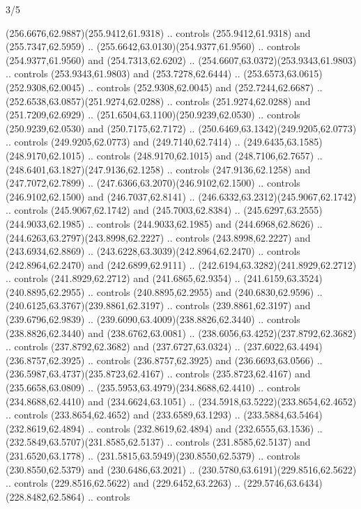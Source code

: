 \begin{flagdescription}{3/5}
\begin{scope}[xshift=0.5\flaglength,yshift=0.5\flagwidth,scale=\flagwidth/99]
\begin{scope}[y=0.8pt, x=0.8pt, yscale=-0.20628, xscale=0.20628,shift={(-500,-300)}]
\begin{scope}[cm={{0.79646,0.0,0.0,0.7753,(100.0721,273.79617)}}]
\begin{scope}[cm={{-1.08438,0.0,0.0,1.08438,(1036.5897,-11.27143)}}]
\begin{scope}[cm={{-1.03962,0.13985,0.13985,1.03962,(780.1168,-25.80961)}}]
  (256.6676,62.9887)(255.9412,61.9318) .. controls (255.9412,61.9318) and
  (255.7347,62.5959) .. (255.6642,63.0130)(254.9377,61.9560) .. controls
  (254.9377,61.9560) and (254.7313,62.6202) ..
  (254.6607,63.0372)(253.9343,61.9803) .. controls (253.9343,61.9803) and
  (253.7278,62.6444) .. (253.6573,63.0615)(252.9308,62.0045) .. controls
  (252.9308,62.0045) and (252.7244,62.6687) ..
  (252.6538,63.0857)(251.9274,62.0288) .. controls (251.9274,62.0288) and
  (251.7209,62.6929) .. (251.6504,63.1100)(250.9239,62.0530) .. controls
  (250.9239,62.0530) and (250.7175,62.7172) ..
  (250.6469,63.1342)(249.9205,62.0773) .. controls (249.9205,62.0773) and
  (249.7140,62.7414) .. (249.6435,63.1585)(248.9170,62.1015) .. controls
  (248.9170,62.1015) and (248.7106,62.7657) ..
  (248.6401,63.1827)(247.9136,62.1258) .. controls (247.9136,62.1258) and
  (247.7072,62.7899) .. (247.6366,63.2070)(246.9102,62.1500) .. controls
  (246.9102,62.1500) and (246.7037,62.8141) ..
  (246.6332,63.2312)(245.9067,62.1742) .. controls (245.9067,62.1742) and
  (245.7003,62.8384) .. (245.6297,63.2555)(244.9033,62.1985) .. controls
  (244.9033,62.1985) and (244.6968,62.8626) ..
  (244.6263,63.2797)(243.8998,62.2227) .. controls (243.8998,62.2227) and
  (243.6934,62.8869) .. (243.6228,63.3039)(242.8964,62.2470) .. controls
  (242.8964,62.2470) and (242.6899,62.9111) ..
  (242.6194,63.3282)(241.8929,62.2712) .. controls (241.8929,62.2712) and
  (241.6865,62.9354) .. (241.6159,63.3524)(240.8895,62.2955) .. controls
  (240.8895,62.2955) and (240.6830,62.9596) ..
  (240.6125,63.3767)(239.8861,62.3197) .. controls (239.8861,62.3197) and
  (239.6796,62.9839) .. (239.6090,63.4009)(238.8826,62.3440) .. controls
  (238.8826,62.3440) and (238.6762,63.0081) ..
  (238.6056,63.4252)(237.8792,62.3682) .. controls (237.8792,62.3682) and
  (237.6727,63.0324) .. (237.6022,63.4494)(236.8757,62.3925) .. controls
  (236.8757,62.3925) and (236.6693,63.0566) ..
  (236.5987,63.4737)(235.8723,62.4167) .. controls (235.8723,62.4167) and
  (235.6658,63.0809) .. (235.5953,63.4979)(234.8688,62.4410) .. controls
  (234.8688,62.4410) and (234.6624,63.1051) ..
  (234.5918,63.5222)(233.8654,62.4652) .. controls (233.8654,62.4652) and
  (233.6589,63.1293) .. (233.5884,63.5464)(232.8619,62.4894) .. controls
  (232.8619,62.4894) and (232.6555,63.1536) ..
  (232.5849,63.5707)(231.8585,62.5137) .. controls (231.8585,62.5137) and
  (231.6520,63.1778) .. (231.5815,63.5949)(230.8550,62.5379) .. controls
  (230.8550,62.5379) and (230.6486,63.2021) ..
  (230.5780,63.6191)(229.8516,62.5622) .. controls (229.8516,62.5622) and
  (229.6452,63.2263) .. (229.5746,63.6434)(228.8482,62.5864) .. controls

\end{scope}
\end{scope}
\end{scope}
\end{scope}
\end{scope}
\end{flagdescription}
